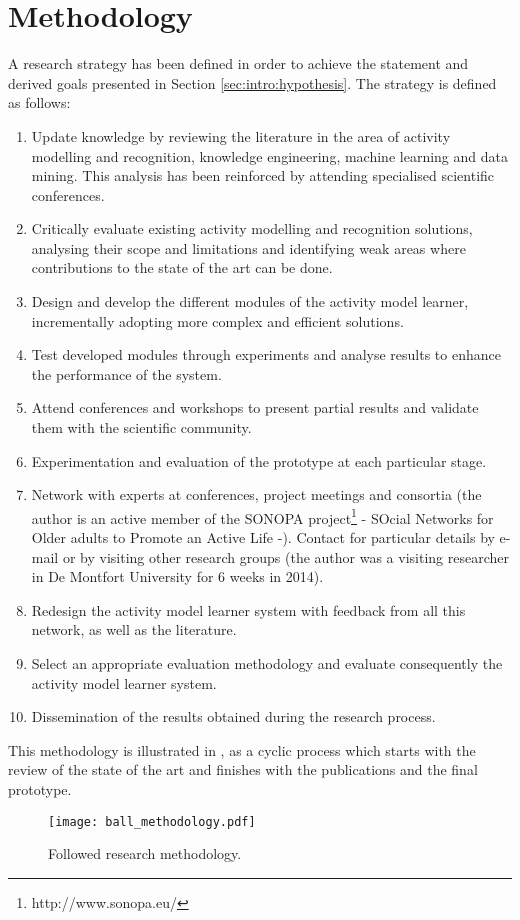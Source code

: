 \section{Methodology}
\label{sec:intro:methodology}

A research strategy has been defined in order to achieve the statement and derived goals presented
in Section \ref{sec:intro:hypothesis}. The strategy is defined as follows:

\begin{enumerate}
    \item Update knowledge by reviewing the literature in the area of activity modelling and recognition, knowledge engineering, machine learning and data mining. This analysis has been reinforced by attending specialised scientific conferences.
    \item Critically evaluate existing activity modelling and recognition solutions, analysing their scope and limitations and identifying weak areas where contributions to the state of the art can be done.
    \item Design and develop the different modules of the activity model learner, incrementally adopting more complex and efficient solutions.
    \item Test developed modules through experiments and analyse results to enhance the performance of the system.
    \item Attend conferences and workshops to present partial results and validate them with the scientific community.
    \item Experimentation and evaluation of the prototype at each particular stage.
    \item Network with experts at conferences, project meetings and consortia (the author is an active member of the SONOPA project\footnote{http://www.sonopa.eu/} - SOcial Networks for Older adults to Promote an Active Life -). Contact for particular details by e-mail or by visiting other research groups (the author was a visiting researcher in De Montfort University for 6 weeks in 2014).
    \item Redesign the activity model learner system with feedback from all this network, as well as the literature.
    \item Select an appropriate evaluation methodology and evaluate consequently the activity model learner system.
    \item Dissemination of the results obtained during the research process.
\end{enumerate}

This methodology is illustrated in , as a cyclic process which starts with the review of the state of the art and finishes with the publications and the final prototype.

\begin{figure}[htbp]
\centering
\texttt{[image: ball\_methodology.pdf]}
    \caption{Followed research methodology.}
    \label{fig-methodology}
\end{figure}


